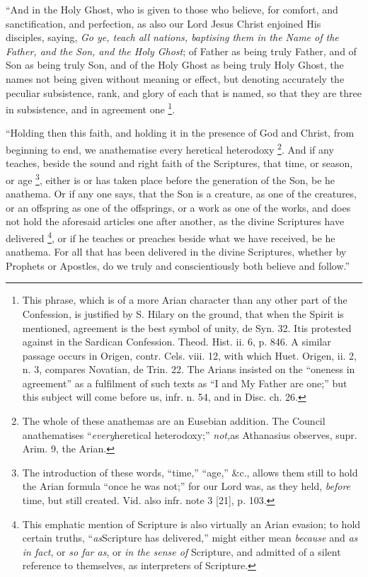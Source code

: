 ``And in the Holy Ghost, who is
given to those who believe, for comfort, and sanctification, and
perfection, as also our Lord Jesus Christ enjoined His disciples,
saying, \emph{Go ye, teach all nations, baptising them in the Name of the
Father, and the Son, and the Holy Ghost}; of Father as being truly
Father, and of Son as being truly Son, and of the Holy Ghost as being
truly Holy Ghost, the names not being given without meaning or effect,
but denoting accurately the peculiar subsistence, rank, and glory of
each that is named, so that they are three in subsistence, and in
agreement one \footnote{This phrase, which is of a more Arian character than any other part of
the Confession, is justified by S. Hilary on the ground, that when the
Spirit is mentioned, agreement is the best symbol of unity, de Syn.
32. It\emph{}is protested against in the Sardican Confession. Theod.
Hist. ii. 6, p. 846. A similar passage occurs in Origen, contr. Cels.
viii. 12, with which Huet. Origen, ii. 2, n. 3, compares Novatian, de
Trin. 22. The Arians insisted on the ``oneness in agreement'' as a
fulfilment of such texts as ``I and My Father are one;'' but this
subject will come before us, infr. n. 54, and in Disc. ch. 26.}.

``Holding then this faith, and
holding it in the presence of God and Christ, from beginning to end,
we anathematise every heretical heterodoxy \footnote{The whole of these anathemas are an Eusebian addition. The Council
anathematises ``\emph{every}heretical heterodoxy;'' \emph{not,}as
Athanasius observes, supr. Arim. 9, the Arian.}. And if any teaches, beside the sound and right faith of the
Scriptures, that time, or season, or age \footnote{The introduction of these words, ``time,'' ``age,'' \&c., allows them
still to hold the Arian formula ``once he was not;'' for our Lord was,
as they held, \emph{before} time, but still created. Vid. also infr.
note 3 [21], p. 103.}, either is or has taken place before the generation of the
Son, be he anathema. Or if any one says, that the Son is a creature,
as one of the creatures, or an offspring as one of the offsprings, or
a work as one of the works, and does not hold the aforesaid articles
one after another, as the divine Scriptures have delivered \footnote{This emphatic mention of Scripture is also virtually an Arian evasion;
to hold certain truths, ``\emph{as}Scripture has delivered,'' might
either mean \emph{because} and \emph{as in fact}, or \emph{so far as},
or \emph{in the sense of} Scripture, and admitted of a silent
reference to themselves, as interpreters of Scripture.}, or if he teaches or preaches beside what we have received, be
he anathema. For all that has been delivered in the divine Scriptures,
whether by Prophets or Apostles, do we truly and conscientiously both
believe and follow.''

